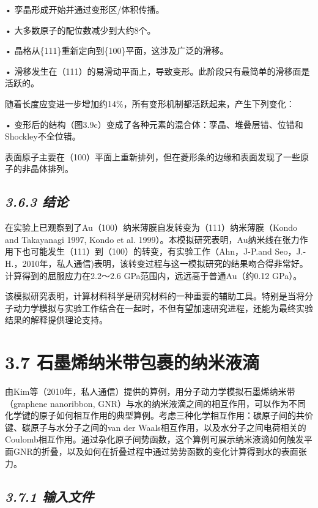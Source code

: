\documentclass[
]{article}
\begin{document}
• 孪晶形成开始并通过变形区/体积传播。

• 大多数原子的配位数减少到大约8个。

• 晶格从\{111\}重新定向到\{100\}平面，这涉及广泛的滑移。

•
滑移发生在（111）的易滑动平面上，导致变形。此阶段只有最简单的滑移面是活跃的。

随着长度应变进一步增加约14\%，所有变形机制都活跃起来，产生下列变化：

•
变形后的结构（图3.9c）变成了各种元素的混合体：孪晶、堆叠层错、位错和Shockley不全位错。

表面原子主要在（100）平面上重新排列，但在菱形条的边缘和表面发现了一些原子的非晶体排列。

\hypertarget{ux7ed3ux8bba}{%
\subsection{\texorpdfstring{\emph{3.6.3
结论}}{3.6.3 结论}}\label{ux7ed3ux8bba}}

在实验上已观察到了Au（100）纳米薄膜自发转变为（111）纳米薄膜（Kondo and
Takayanagi 1997, Kondo et al.
1999）。本模拟研究表明，Au纳米线在张力作用下也可能发生（111）到（100）的转变，有实验工作（Ahn，J-P.and
Seo，J.-H.，2010年，私人通信)表明，该转变过程与这一模拟研究的结果吻合得非常好。计算得到的屈服应力在2.2～2.6
GPa范围内，远远高于普通Au（约0.12 GPa）。

该模拟研究表明，计算材料科学是研究材料的一种重要的辅助工具。特别是当将分子动力学模拟与实验工作结合在一起时，不但有望加速研究进程，还能为最终实验结果的解释提供理论支持。

\hypertarget{ux77f3ux58a8ux70efux7eb3ux7c73ux5e26ux5305ux88f9ux7684ux7eb3ux7c73ux6db2ux6ef4}{%
\section{3.7
石墨烯纳米带包裹的纳米液滴}\label{ux77f3ux58a8ux70efux7eb3ux7c73ux5e26ux5305ux88f9ux7684ux7eb3ux7c73ux6db2ux6ef4}}

由Kim等（2010年，私人通信）提供的算例，用分子动力学模拟石墨烯纳米带（graphene
nanoribbon,
GNR）与水的纳米液滴之间的相互作用，可以作为不同化学键的原子如何相互作用的典型算例。考虑三种化学相互作用：碳原子间的共价键、碳原子与水分子之间的van
der
Waals相互作用，以及水分子之间电荷相关的Coulomb相互作用。通过杂化原子间势函数，这个算例可展示纳米液滴如何触发平面GNR的折叠，以及如何在折叠过程中通过势势函数的变化计算得到水的表面张力。

\hypertarget{ux8f93ux5165ux6587ux4ef6-5}{%
\subsection{\texorpdfstring{\emph{3.7.1
输入文件}}{3.7.1 输入文件}}\label{ux8f93ux5165ux6587ux4ef6-5}}
\end{document}
